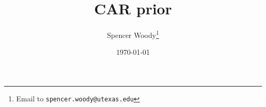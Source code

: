 \documentclass[usletter]{article}
\title{CAR prior}
\author{Spencer Woody\footnote{Email to \texttt{spencer.woody@utexas.edu}}}
\affil{The University of Texas at Austin}
\date{\today}
\begin{document}
\maketitle



\cite{WoodyScott}


\pagebreak


\end{document}
